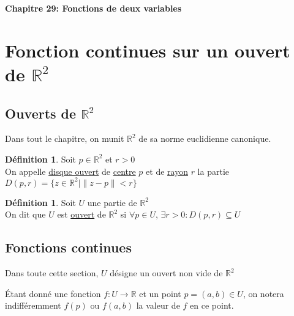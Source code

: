 \documentclass[10pt,a4paper]{article}
\theoremstyle{definition}
\newtheorem{definition}[proposition]{Définition}
\begin{document}
\renewcommand{\labelitemi}{$*$}
\begin{center}
{\Large \textbf{Chapitre 29: Fonctions de deux variables}}
\end{center}

\section{Fonction continues sur un ouvert de $\mathbb{R}^2$}
\subsection{Ouverts de $\mathbb{R}^2$}
Dans tout le chapitre, on munit $\mathbb{R}^2$ de sa norme euclidienne canonique.
\begin{definition}
Soit $p \in \mathbb{R}^2$ et $r > 0$ \\
On appelle \uline{disque ouvert} de \uline{centre} $p$ et de \uline{rayon} $r$ la partie $D(p, r) = \{ z \in \mathbb{R}^2 \mid \| z - p \| < r \}$
\end{definition}
\begin{definition}
Soit $U$ une partie de $\mathbb{R}^2$ \\
On dit que $U$ est \uline{ouvert} de $\mathbb{R}^2$ si $\forall p \in U$, $\exists r > 0: D(p, r) \subseteq U$
\end{definition}

\subsection{Fonctions continues}
Dans toute cette section, $U$ désigne un ouvert non vide de $\mathbb{R}^2$ \medskip

\noindent Étant donné une fonction $f: U \to \mathbb{R}$ et un point $p = (a, b) \in U$, on notera indifféremment $f(p)$ ou $f(a, b)$ la valeur de $f$ en ce point. \medskip
\end{document}
